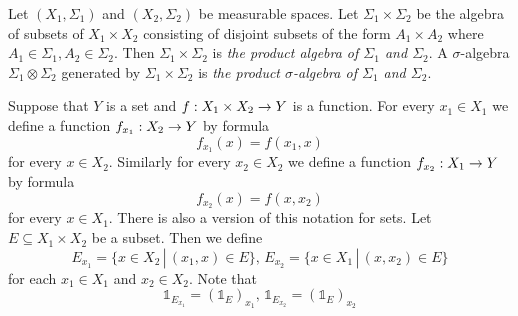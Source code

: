 \begin{definition}
Let $(X_1,\Sigma_1)$ and $(X_2,\Sigma_2)$ be measurable spaces. Let $\Sigma_1\times \Sigma_2$ be the algebra of subsets of $X_1\times X_2$ consisting of disjoint subsets of the form $A_1\times A_2$ where $A_1 \in \Sigma_1,A_2\in \Sigma_2$. Then $\Sigma_1\times \Sigma_2$ is \textit{the product algebra of $\Sigma_1$ and $\Sigma_2$}. A $\sigma$-algebra $\Sigma_1\otimes \Sigma_2$ generated by $\Sigma_1\times \Sigma_2$ is \textit{the product $\sigma$-algebra of $\Sigma_1$ and $\Sigma_2$}.
\end{definition}
\noindent
Suppose that $Y$ is a set and $f:X_1\times X_2\rightarrow Y$ is a function. For every $x_1\in X_1$ we define a function $f_{x_1}:X_2\rightarrow Y$ by formula 
$$f_{x_1}(x) = f(x_1,x)$$
for every $x \in X_2$. Similarly for every $x_2\in X_2$ we define a function $f_{x_2}:X_1\rightarrow Y$ by formula
$$f_{x_2}(x) = f(x,x_2)$$
for every $x \in X_1$. There is also a version of this notation for sets. Let $E\subseteq X_1\times X_2$ be a subset. Then we define
$$E_{x_1} = \{x\in X_2\,|\,(x_1,x)\in E\},\,E_{x_2} = \{x\in X_1\,|\,(x,x_2)\in E\}$$
for each $x_1\in X_1$ and $x_2\in X_2$. Note that
$$\mathbb{1}_{E_{x_1}} = \left(\mathbb{1}_E\right)_{x_1},\,\mathbb{1}_{E_{x_2}} = \left(\mathbb{1}_E\right)_{x_2}$$

